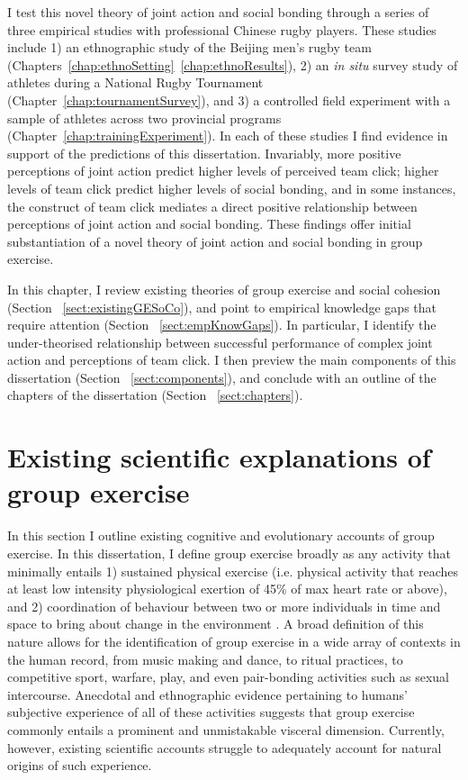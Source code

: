 \begin{CJK}{UTF8}{gbsn}
I test this novel theory of joint action and social bonding through a series of three empirical studies with professional Chinese rugby players. These studies include 1) an ethnographic study of the Beijing men's rugby team (Chapters~\ref{chap:ethnoSetting}\nobreakdash~\ref{chap:ethnoResults}), 2) an \textit{in situ} survey study of athletes during a National Rugby Tournament (Chapter~\ref{chap:tournamentSurvey}), and 3) a controlled field experiment with a sample of athletes across two provincial programs (Chapter~\ref{chap:trainingExperiment}).  In each of these studies I find evidence in support of the predictions of this dissertation.  Invariably, more positive perceptions of joint action predict higher levels of perceived team click; higher levels of team click predict higher levels of social bonding, and in some instances, the construct of team click mediates a direct positive relationship between perceptions of joint action and social bonding.  These findings offer initial substantiation of a novel theory of joint action and social bonding in group exercise.

In this chapter, I review existing theories of group exercise and social cohesion (Section ~\ref{sect:existingGESoCo}), and point to empirical knowledge gaps that require attention (Section ~\ref{sect:empKnowGaps}). In particular, I identify the under-theorised relationship between successful performance of complex joint action and perceptions of team click.  I then preview the main components of this dissertation (Section ~\ref{sect:components}), and conclude with an outline of the chapters of the dissertation (Section ~\ref{sect:chapters}).



\section{Existing scientific explanations of group exercise\label{sect:GESoCo}}

In this section I outline existing cognitive and evolutionary accounts of group exercise.  In this dissertation, I define group exercise broadly as any activity that minimally entails 1) sustained physical exercise (i.e. physical activity that reaches at least low intensity physiological exertion of 45\% of max heart rate or above), and 2) coordination of behaviour between two or more individuals in time and space to bring about change in the environment \citep[a.k.a., joint action, see][]{Sebanz2006}.  A broad definition of this nature allows for the identification of group exercise in a wide array of contexts in the human record, from music making and dance, to ritual practices, to competitive sport, warfare, play, and even pair-bonding activities such as sexual intercourse.  Anecdotal and ethnographic evidence pertaining to humans' subjective experience of all of these activities suggests that group exercise commonly entails a prominent and unmistakable visceral dimension.  Currently, however, existing scientific accounts struggle to adequately account for natural origins of such experience.


\end{CJK}
